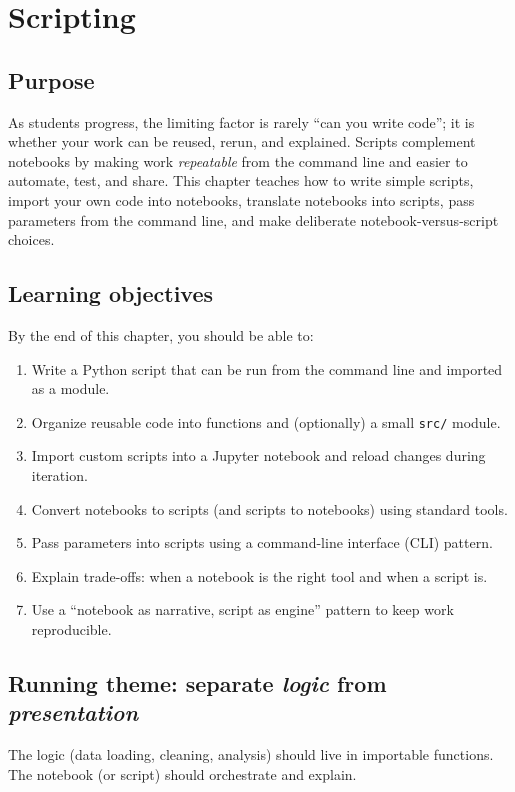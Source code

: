 \chapter{Scripting}
\label{ch:scripts-vs-notebooks}

\section*{Purpose}
As students progress, the limiting factor is rarely ``can you write code''; it is whether your work can be reused, rerun, and explained. Scripts complement notebooks by making work \emph{repeatable} from the command line and easier to automate, test, and share. This chapter teaches how to write simple scripts, import your own code into notebooks, translate notebooks into scripts, pass parameters from the command line, and make deliberate notebook-versus-script choices.

\section*{Learning objectives}
By the end of this chapter, you should be able to:
\begin{enumerate}
\item Write a Python script that can be run from the command line and imported as a module.
\item Organize reusable code into functions and (optionally) a small \texttt{src/} module.
\item Import custom scripts into a Jupyter notebook and reload changes during iteration.
\item Convert notebooks to scripts (and scripts to notebooks) using standard tools.
\item Pass parameters into scripts using a command-line interface (CLI) pattern.
\item Explain trade-offs: when a notebook is the right tool and when a script is.
\item Use a ``notebook as narrative, script as engine'' pattern to keep work reproducible.
\end{enumerate}

\section*{Running theme: separate \emph{logic} from \emph{presentation}}
The logic (data loading, cleaning, analysis) should live in importable functions. The notebook (or script) should orchestrate and explain.

